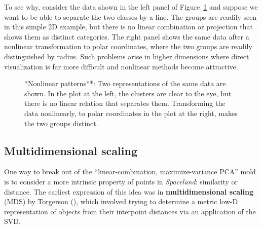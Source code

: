 \documentclass[
  letterpaper,
  10pt,
  krantz2]{krantz}
\begin{document}
To see why, consider the data shown in the left panel of
Figure~\ref{fig-nonlin-demo} and suppose we want to be able to separate
the two classes by a line. The groups are readily seen in this simple 2D
example, but there is no linear combination or projection that shows
them as distinct categories. The right panel shows the same data after a
nonlinear transformation to polar coordinates, where the two groups are
readily distinguished by radius. Such problems arise in higher
dimensions where direct visualization is far more difficult and
nonlinear methods become attractive.

\begin{figure}


\caption{\label{fig-nonlin-demo}*Nonlinear patterns**: Two
representations of the same data are shown. In the plot at the left, the
clusters are clear to the eye, but there is no linear relation that
separates them. Transforming the data nonlinearly, to polar coordinates
in the plot at the right, makes the two groups distinct.}

\end{figure}%

\subsection{Multidimensional scaling}\label{multidimensional-scaling}

One way to break out of the ``linear-combination, maximize-variance
PCA'' mold is to consider a more intrinsic property of points in
\emph{Spaceland}: similarity or distance. The earliest expression of
this idea was in \textbf{multidimensional scaling} (MDS) by Torgerson
(), which involved trying to determine
a metric low-D representation of objects from their interpoint distances
via an application of the SVD.
\end{document}
